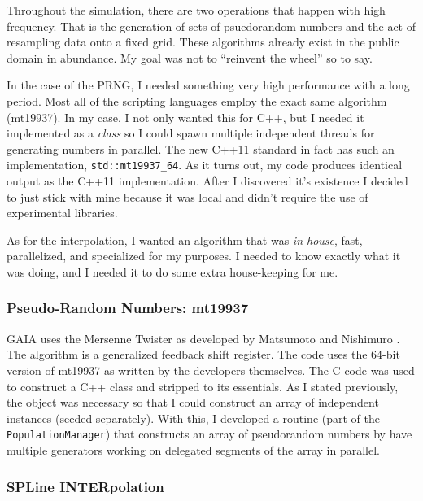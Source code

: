 \documentclass[10pt,a4paper,final]{article}
\numberwithin{equation}{section}
\begin{document}
\begin{multicols}{2}[]
				Throughout the simulation, there are two operations that happen with high
				frequency. That is the generation of sets of psuedorandom numbers and
				the act of resampling data onto a fixed grid. These algorithms already
				exist in the public domain in abundance. My goal was not to ``reinvent
				the wheel'' so to say. 
				
				In the case of the PRNG, I needed something very
				high performance with a long period. Most all of the scripting languages
				employ the exact same algorithm (mt19937). In my case, I not only wanted
				this for C++, but I needed it implemented as a \textit{class} so I could
				spawn multiple independent threads for generating numbers in parallel.
				The new C++11 standard in fact has such an implementation, 
				\texttt{std::mt19937\_64}. As it turns out, my code produces identical
				output as the C++11 implementation. After I discovered it's existence
				I decided to just stick with mine because it was local and didn't require
				the use of experimental libraries.

				As for the interpolation, I wanted an algorithm that was \textit{in house},
				fast, parallelized, and specialized for my purposes. I needed to know 
				exactly what it was doing, and I needed it to do some extra house-keeping
				for me.

			\subsubsection{Pseudo-Random Numbers: mt19937}
				
				GAIA uses the Mersenne Twister as developed by Matsumoto and
				Nishimuro \cite{mt1,mt2}. The algorithm is a generalized feedback
				shift register. The code uses the 64-bit version of mt19937 as
				written by the developers themselves. The C-code was used to
				construct a C++ class and stripped to its essentials. As I stated
				previously, the object was necessary so that I could construct an
				array of independent instances (seeded separately). With this,
				I developed a routine (part of the \texttt{PopulationManager})
				that constructs an array of pseudorandom numbers by have multiple
				generators working on delegated segments of the array in parallel.

			\subsubsection{SPLine INTERpolation}


\end{multicols}
\end{document}
